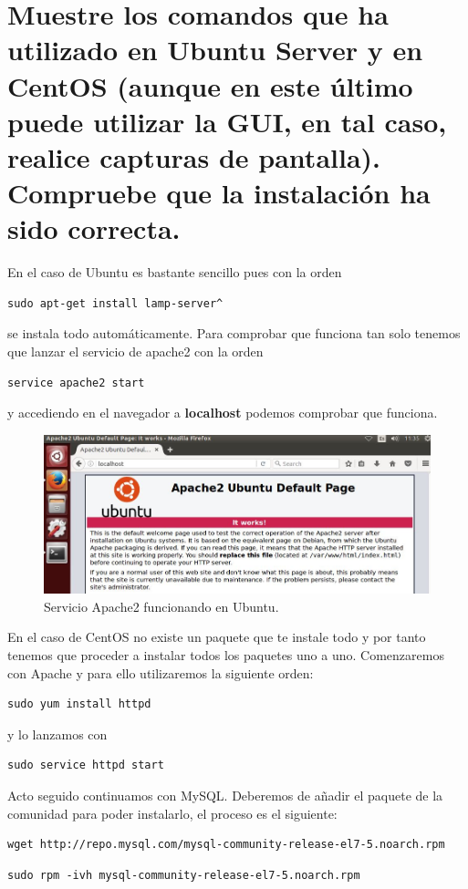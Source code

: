 \section{Muestre los comandos que ha utilizado en Ubuntu Server y en CentOS (aunque en este último puede utilizar la GUI, en tal caso, realice capturas de pantalla). Compruebe que la instalación ha sido correcta.}
En el caso de Ubuntu es bastante sencillo pues con la orden \begin{verbatim}sudo apt-get install lamp-server^\end{verbatim} se instala todo automáticamente. Para comprobar que funciona tan solo tenemos que lanzar el servicio de apache2 con la orden \begin{verbatim}service apache2 start\end{verbatim} y accediendo en el navegador a \textbf{localhost} podemos comprobar que funciona.
\begin{figure}[H]
	\centering
	\includegraphics[scale=0.6]{apache2-ubuntu-works.jpg}
	\caption{Servicio Apache2 funcionando en Ubuntu. \label{fig:figura17}}
\end{figure}
\vspace{9mm}
En el caso de CentOS no existe un paquete que te instale todo y por tanto tenemos que proceder a instalar todos los paquetes uno a uno. Comenzaremos con Apache\cite{apache} y para ello utilizaremos la siguiente orden: \begin{verbatim}sudo yum install httpd\end{verbatim} y lo lanzamos con \begin{verbatim}sudo service httpd start\end{verbatim}
Acto seguido continuamos con MySQL\cite{mysql}. Deberemos de añadir el paquete de la comunidad para poder instalarlo, el proceso es el siguiente:
\begin{verbatim}wget http://repo.mysql.com/mysql-community-release-el7-5.noarch.rpm\end{verbatim}
\begin{verbatim}sudo rpm -ivh mysql-community-release-el7-5.noarch.rpm\end{verbatim}
